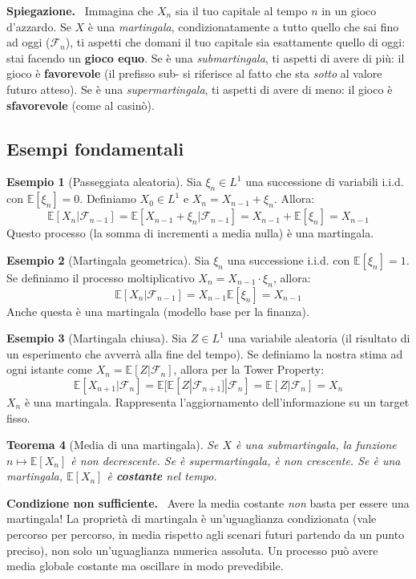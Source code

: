 \documentclass[11pt, a4paper]{report}
\theoremstyle{plain}
\newtheorem{theorem}{Teorema}[chapter]
\theoremstyle{definition}
\newtheorem{esempio}[theorem]{Esempio}
\theoremstyle{remark}
\newenvironment{hint}[1][Hint]
{\begin{mdframed}[backgroundcolor=blue!5, linecolor=blue!50, linewidth=2pt, topline=false, rightline=false, bottomline=false]
\textbf{\textsf{#1.}}\ }
{\end{mdframed}}
\newenvironment{spiegazione}[1][Spiegazione]
{\begin{mdframed}[backgroundcolor=green!5, linecolor=green!50, linewidth=2pt, topline=false, rightline=false, bottomline=false]
\textbf{\textsf{#1.}}\ }
{\end{mdframed}}
\newcommand{\E}{\mathbb{E}}
\newcommand{\F}{\mathcal{F}}
\newcommand{\1}{\mathbf{1}}
\begin{document}
\begin{spiegazione}
Immagina che $X_n$ sia il tuo capitale al tempo $n$ in un gioco d'azzardo. 
Se $X$ è una \emph{martingala}, condizionatamente a tutto quello che sai fino ad oggi ($\F_n$), ti aspetti che domani il tuo capitale sia esattamente quello di oggi: stai facendo un \textbf{gioco equo}.
Se è una \emph{submartingala}, ti aspetti di avere di più: il gioco è \textbf{favorevole} (il prefisso sub- si riferisce al fatto che sta \emph{sotto} al valore futuro atteso).
Se è una \emph{supermartingala}, ti aspetti di avere di meno: il gioco è \textbf{sfavorevole} (come al casinò).
\end{spiegazione}

\subsection*{Esempi fondamentali}

\begin{esempio}[Passeggiata aleatoria]
Sia $\xi_n \in L^1$ una successione di variabili i.i.d. con $\E[\xi_n] = 0$. Definiamo $X_0 \in L^1$ e $X_n = X_{n-1} + \xi_n$. Allora:
\[ \E[X_n | \F_{n-1}] = \E[X_{n-1} + \xi_n | \F_{n-1}] = X_{n-1} + \E[\xi_n] = X_{n-1} \]
Questo processo (la somma di incrementi a media nulla) è una martingala.
\end{esempio}

\begin{esempio}[Martingala geometrica]
Sia $\xi_n$ una successione i.i.d. con $\E[\xi_n] = 1$. Se definiamo il processo moltiplicativo $X_n = X_{n-1} \cdot \xi_n$, allora:
\[ \E[X_n | \F_{n-1}] = X_{n-1} \E[\xi_n] = X_{n-1} \]
Anche questa è una martingala (modello base per la finanza).
\end{esempio}

\begin{esempio}[Martingala chiusa]
Sia $Z \in L^1$ una variabile aleatoria (il risultato di un esperimento che avverrà alla fine del tempo). Se definiamo la nostra stima ad ogni istante come $X_n = \E[Z | \F_n]$, allora per la Tower Property:
\[ \E[X_{n+1} | \F_n] = \E[\E[Z | \F_{n+1}] | \F_n] = \E[Z | \F_n] = X_n \]
$X_n$ è una martingala. Rappresenta l'aggiornamento dell'informazione su un target fisso.
\end{esempio}

\begin{theorem}[Media di una martingala]
Se $X$ è una submartingala, la funzione $n \mapsto \E[X_n]$ è non decrescente.
Se è supermartingala, è non crescente.
Se è una martingala, $\E[X_n]$ è \textbf{costante} nel tempo.
\end{theorem}
\begin{hint}[Condizione non sufficiente]
Avere la media costante \emph{non} basta per essere una martingala! La proprietà di martingala è un'uguaglianza condizionata (vale percorso per percorso, in media rispetto agli scenari futuri partendo da un punto preciso), non solo un'uguaglianza numerica assoluta. Un processo può avere media globale costante ma oscillare in modo prevedibile.
\end{hint}
\end{document}
